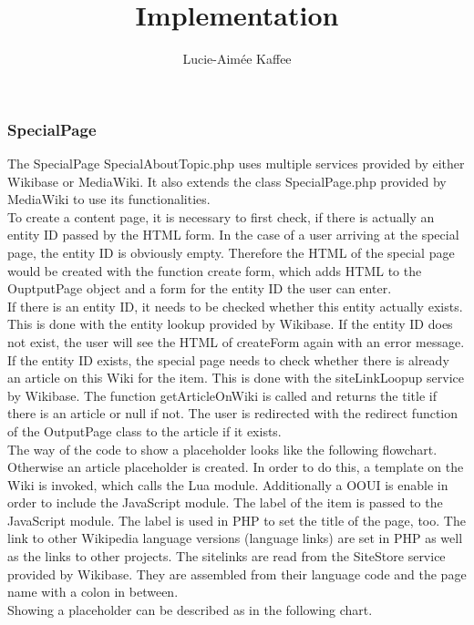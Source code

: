 \documentclass[11pt]{article}
\title {{Implementation}}
\author {Lucie-Aim\'{e}e Kaffee}
\date{}
\begin{document}
\subsubsection{SpecialPage}

The SpecialPage SpecialAboutTopic.php uses multiple services provided by either Wikibase or MediaWiki. It also extends the class SpecialPage.php provided by MediaWiki to use its functionalities. \\
To create a content page, it is necessary to first check, if there is actually an entity ID passed by the HTML form. In the case of a user arriving at the special page, the entity ID is obviously empty. Therefore the HTML of the special page would be created with the function create form, which adds HTML to the OuptputPage object and a form for the entity ID the user can enter. \\
If there is an entity ID, it needs to be checked whether this entity actually exists. This is done with the entity lookup provided by Wikibase. If the entity ID does not exist, the user will see the HTML of createForm again with an error message.
If the entity ID exists, the special page needs to check whether there is already an article on this Wiki for the item. This is done with the siteLinkLoopup service by Wikibase. The function getArticleOnWiki is called and returns the title if there is an article or null if not. The user is redirected with the redirect function of the OutputPage class to the article if it exists.  \\
The way of the code to show a placeholder looks like the following flowchart. \\



Otherwise an article placeholder is created. In order to do this, a template on the Wiki is invoked, which calls the Lua module. Additionally a OOUI is enable in order to include the JavaScript module. The label of the item is passed to the JavaScript module. The label is used in PHP to set the title of the page, too. The link to other Wikipedia language versions (language links) are set in PHP as well as the links to other projects. The sitelinks are read from the SiteStore service provided by Wikibase. They are assembled from their language code and the page name with a colon in between. \\
Showing a placeholder can be described as in the following chart. \\ 


\end{document}
